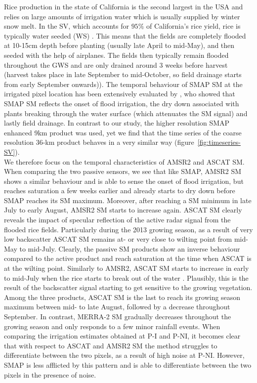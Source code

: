 \documentclass[hess, manuscript]{copernicus}
\begin{document}
Rice production in the state of California is the second largest in the USA \citep{nass2012census} and relies on large amounts of irrigation water which is usually supplied by winter snow melt. In the SV, which accounts for $95\%$ of California's rice yield, rice is typically water seeded (WS) \citep{Linquist2015}. This means that the fields are completely flooded at 10-15cm depth before planting (usually late April to mid-May), and then seeded with the help of airplanes. The fields then typically remain flooded throughout the GWS and are only drained around 3 weeks before harvest (harvest takes place in late September to mid-October, so field drainage starts from early September onwards)). The temporal behaviour of SMAP SM at the irrigated pixel location has been extensively evaluated by \citet{Lawston2017}, who showed that SMAP SM reflects the onset of flood irrigation, the dry down associated with plants breaking through the water surface (which attenuates the SM signal) and lastly field drainage. In contrast to our study, the higher resolution SMAP enhanced 9km product was used, yet we find that the time series of the coarse resolution 36-km product behaves in a very similar way (figure~\ref{fig:timeseries-SV}).\\

We therefore focus on the temporal characteristics of AMSR2 and ASCAT SM. When comparing the two passive sensors, we see that like SMAP, AMSR2 SM shows a similar behaviour and is able to sense the onset of flood irrigation, but reaches saturation a few weeks earlier and already starts to dry down before SMAP reaches its SM maximum. Moreover, after reaching a SM minimum in late July to early August, AMSR2 SM starts to increase again. ASCAT SM clearly reveals the impact of specular reflection of the active radar signal from the flooded rice fields. Particularly during the 2013 growing season, as a result of very low backscatter ASCAT SM remains at- or very close to wilting point from mid-May to mid-July. Clearly, the passive SM products show an inverse behaviour compared to the active product and reach saturation at the time when ASCAT is at the wilting point. Similarly to AMSR2, ASCAT SM starts to increase in early to mid-July when the rice starts to break out of the water \citep{Lawston2017}. Plausibly, this is the result of the backscatter signal starting to get sensitive to the growing vegetation. Among the three products, ASCAT SM is the last to reach its growing season maximum between mid- to late August, followed by a decrease throughout September. In contrast, MERRA-2 SM gradually decreases throughout the growing season and only responds to a few minor rainfall events. When comparing the irrigation estimates obtained at P-I and P-NI, it becomes clear that with respect to ASCAT and AMSR2 SM the method struggles to differentiate between the two pixels, as a result of high noise at P-NI. However, SMAP is less afflicted by this pattern and is able to differentiate between the two pixels in the presence of noise.\\
\end{document}
